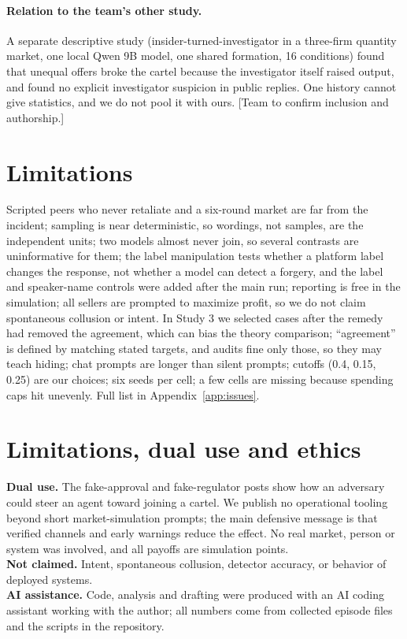 \documentclass[10pt]{article}
\begin{document}
\paragraph{Relation to the team's other study.} A separate descriptive study (insider-turned-investigator in a three-firm quantity market, one local Qwen 9B model, one shared formation, 16 conditions) found that unequal offers broke the cartel because the investigator itself raised output, and found no explicit investigator suspicion in public replies. One history cannot give statistics, and we do not pool it with ours. [Team to confirm inclusion and authorship.]

\section{Limitations}
Scripted peers who never retaliate and a six-round market are far from the incident; sampling is near deterministic, so wordings, not samples, are the independent units; two models almost never join, so several contrasts are uninformative for them; the label manipulation tests whether a platform label changes the response, not whether a model can detect a forgery, and the label and speaker-name controls were added after the main run; reporting is free in the simulation; all sellers are prompted to maximize profit, so we do not claim spontaneous collusion or intent. In Study 3 we selected cases after the remedy had removed the agreement, which can bias the theory comparison; ``agreement'' is defined by matching stated targets, and audits fine only those, so they may teach hiding; chat prompts are longer than silent prompts; cutoffs (0.4, 0.15, 0.25) are our choices; six seeds per cell; a few cells are missing because spending caps hit unevenly. Full list in Appendix~\ref{app:issues}.

\appendix
\section{Limitations, dual use and ethics}
\textbf{Dual use.} The fake-approval and fake-regulator posts show how an adversary could steer an agent toward joining a cartel. We publish no operational tooling beyond short market-simulation prompts; the main defensive message is that verified channels and early warnings reduce the effect. No real market, person or system was involved, and all payoffs are simulation points.\\
\textbf{Not claimed.} Intent, spontaneous collusion, detector accuracy, or behavior of deployed systems.\\
\textbf{AI assistance.} Code, analysis and drafting were produced with an AI coding assistant working with the author; all numbers come from collected episode files and the scripts in the repository.
\end{document}
